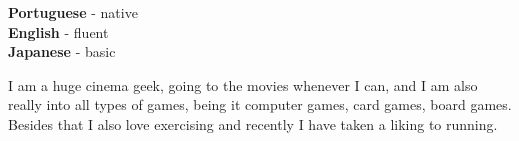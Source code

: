 \documentclass[9pt]{developercv} %
\begin{document}

\begin{minipage}[t]{0.3\textwidth}
	\vspace{-\baselineskip} %

	
	\textbf{Portuguese} - native\\
	\textbf{English} - fluent\\
	\textbf{Japanese} - basic
\end{minipage}
\hfill
\begin{minipage}[t]{0.7\textwidth}
	\vspace{-\baselineskip} %
	

	I am a huge cinema geek, going to the movies whenever I can, and I am also really into all
	types of games, being it computer games, card games, board games. Besides that I also love 
	exercising and recently I have taken a liking to running.
\end{minipage}


\end{document}
